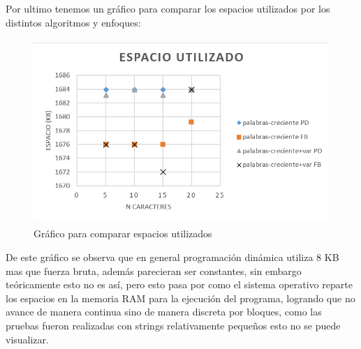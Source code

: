 Por ultimo tenemos un gráfico para comparar los espacios utilizados por los distintos algoritmos y enfoques:

\begin{figure}[H]
    \centering
    \includegraphics[width=12cm, height=7cm]{images/espacio.png}
    \caption{Gráfico para comparar espacios utilizados}
    \label{fig:espacio}
\end{figure}

De este gráfico se observa que en general programación dinámica utiliza 8 KB mas que fuerza bruta, además parecieran ser constantes, sin embargo teóricamente esto no es así, pero esto pasa por como el sistema operativo reparte los espacios en la memoria RAM para la ejecución del programa, logrando que no avance de manera continua sino de manera discreta por bloques, como las pruebas fueron realizadas con strings relativamente pequeños esto no se puede visualizar.